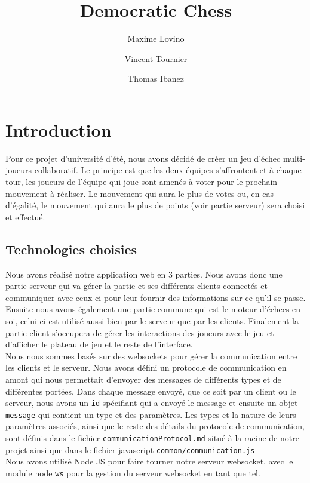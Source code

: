 \documentclass{article}
\title{Democratic Chess}
\author{Maxime Lovino \and Vincent Tournier \and Thomas Ibanez}
\begin{document}
\maketitle

\section{Introduction}
Pour ce projet d'université d'été, nous avons décidé de créer un jeu d'échec multi-joueurs collaboratif. Le principe est que les deux équipes s'affrontent et à chaque tour, les joueurs de l'équipe qui joue sont amenés à voter pour le prochain mouvement à réaliser. Le mouvement qui aura le plus de votes ou, en cas d'égalité, le mouvement qui aura le plus de points (voir partie serveur) sera choisi et effectué.
\subsection{Technologies choisies}
Nous avons réalisé notre application web en 3 parties. Nous avons donc une partie serveur qui va gérer la partie et ses différents clients connectés et communiquer avec ceux-ci pour leur fournir des informations sur ce qu'il se passe.
Ensuite nous avons également une partie commune qui est le moteur d'échecs en soi, celui-ci est utilisé aussi bien par le serveur que par les clients.
Finalement la partie client s'occupera de gérer les interactions des joueurs avec le jeu et d'afficher le plateau de jeu et le reste de l'interface. \\

Nous nous sommes basés sur des websockets pour gérer la communication entre les clients et le serveur. Nous avons défini un protocole de communication en amont qui nous permettait d'envoyer des messages de différents types et de différentes portées. Dans chaque message envoyé, que ce soit par un client ou le serveur, nous avons un \verb+id+ spécifiant qui a envoyé le message et ensuite un objet \verb+message+ qui contient un type et des paramètres. Les types et la nature de leurs paramètres associés, ainsi que le reste des détails du protocole de communication, sont définis dans le fichier \verb+communicationProtocol.md+ situé à la racine de notre projet ainsi que dans le fichier javascript \verb+common/communication.js+ \\

Nous avons utilisé Node JS pour faire tourner notre serveur websocket, avec le module node \verb+ws+ pour la gestion du serveur websocket en tant que tel. \\
\end{document}

